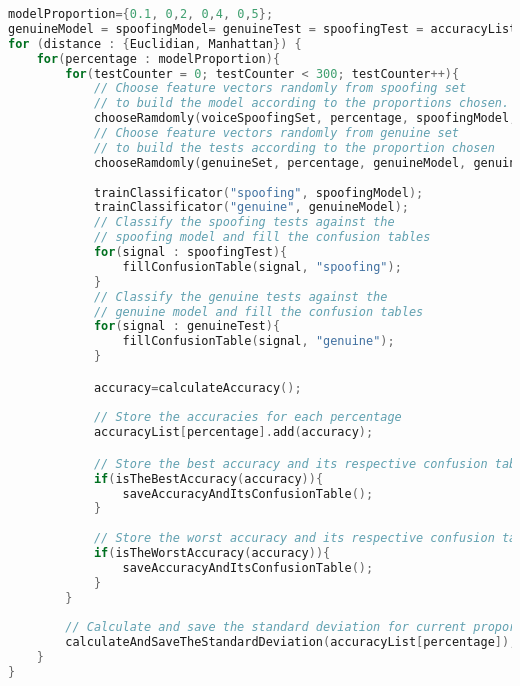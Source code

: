\begin{lstlisting}[language=C++, caption={Procedure 02 algorithm}, label={lst:experiment02Algo}]
modelProportion={0.1, 0,2, 0,4, 0,5};
genuineModel = spoofingModel= genuineTest = spoofingTest = accuracyList = {};
for (distance : {Euclidian, Manhattan}) {
	for(percentage : modelProportion){
		for(testCounter = 0; testCounter < 300; testCounter++){
			// Choose feature vectors randomly from spoofing set
			// to build the model according to the proportions chosen.
			chooseRamdomly(voiceSpoofingSet, percentage, spoofingModel, spoofingTest);
			// Choose feature vectors randomly from genuine set
			// to build the tests according to the proportion chosen
			chooseRamdomly(genuineSet, percentage, genuineModel, genuineTest);
			
			trainClassificator("spoofing", spoofingModel);
			trainClassificator("genuine", genuineModel);
			// Classify the spoofing tests against the 
			// spoofing model and fill the confusion tables
			for(signal : spoofingTest){
				fillConfusionTable(signal, "spoofing");
			} 
			// Classify the genuine tests against the
			// genuine model and fill the confusion tables
			for(signal : genuineTest){
				fillConfusionTable(signal, "genuine");
			}

			accuracy=calculateAccuracy();
			
			// Store the accuracies for each percentage
			accuracyList[percentage].add(accuracy);

			// Store the best accuracy and its respective confusion table
			if(isTheBestAccuracy(accuracy)){
				saveAccuracyAndItsConfusionTable();
			}
			
			// Store the worst accuracy and its respective confusion table
			if(isTheWorstAccuracy(accuracy)){
				saveAccuracyAndItsConfusionTable();
			}
		}
		
		// Calculate and save the standard deviation for current proportion
		calculateAndSaveTheStandardDeviation(accuracyList[percentage]);
	}
}				
\end{lstlisting}